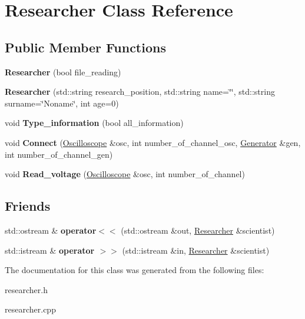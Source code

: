 \hypertarget{class_researcher}{}\section{Researcher Class Reference}
\label{class_researcher}
\subsection*{Public Member Functions}
\begin{DoxyCompactItemize}
\item 
\mbox{\label{class_researcher_aaf925cfe1614c55ac828575e737e1bf8}} 
{\bfseries Researcher} (bool file\+\_\+reading)
\item 
\mbox{\label{class_researcher_a78e8141376dbf8d1a61b2ac72a6832a3}} 
{\bfseries Researcher} (std\+::string research\+\_\+position, std\+::string name=\char`\"{}\char`\"{}, std\+::string surname=\char`\"{}Noname\char`\"{}, int age=0)
\item 
\mbox{\label{class_researcher_adcf3b025c8dc332dc7a4da099d71dbbd}} 
void {\bfseries Type\+\_\+information} (bool all\+\_\+information)
\item 
\mbox{\label{class_researcher_a7d844ffe891bc49cc80e4c90451b9565}} 
void {\bfseries Connect} (\mbox{\hyperlink{class_oscilloscope}{Oscilloscope}} \&osc, int number\+\_\+of\+\_\+channel\+\_\+osc, \mbox{\hyperlink{class_generator}{Generator}} \&gen, int number\+\_\+of\+\_\+channel\+\_\+gen)
\item 
\mbox{\label{class_researcher_a8ae1c0c0149e7cd21ba351ccd1fa0157}} 
void {\bfseries Read\+\_\+voltage} (\mbox{\hyperlink{class_oscilloscope}{Oscilloscope}} \&osc, int number\+\_\+of\+\_\+channel)
\end{DoxyCompactItemize}
\subsection*{Friends}
\begin{DoxyCompactItemize}
\item 
\mbox{\label{class_researcher_ac5864af41d4b745dcaf959d73e9c7ebd}} 
std\+::ostream \& {\bfseries operator$<$$<$} (std\+::ostream \&out, \mbox{\hyperlink{class_researcher}{Researcher}} \&scientist)
\item 
\mbox{\label{class_researcher_a89030cf754d8203c0b39d9c6fe82e62c}} 
std\+::istream \& {\bfseries operator $>$$>$} (std\+::istream \&in, \mbox{\hyperlink{class_researcher}{Researcher}} \&scientist)
\end{DoxyCompactItemize}


The documentation for this class was generated from the following files\+:\begin{DoxyCompactItemize}
\item 
researcher.\+h\item 
researcher.\+cpp\end{DoxyCompactItemize}
